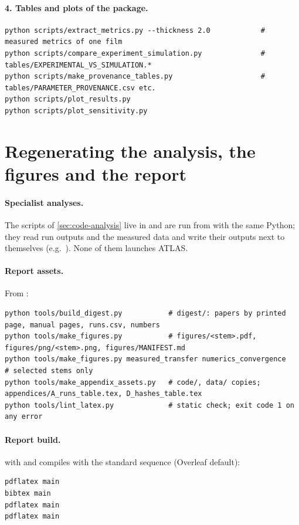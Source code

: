 \paragraph{4. Tables and plots of the package.}
\begin{lstlisting}[language={},numbers=none]
python scripts/extract_metrics.py --thickness 2.0            # measured metrics of one film
python scripts/compare_experiment_simulation.py              # tables/EXPERIMENTAL_VS_SIMULATION.*
python scripts/make_provenance_tables.py                     # tables/PARAMETER_PROVENANCE.csv etc.
python scripts/plot_results.py
python scripts/plot_sensitivity.py
\end{lstlisting}

\section{Regenerating the analysis, the figures and the report}\label{sec:repro-figures}

\paragraph{Specialist analyses.} The scripts of \cref{sec:code-analysis} live in
 and are run from  with the same Python;
they read run outputs and the measured data and write their outputs next to themselves
(e.g.\ ). None of them launches ATLAS.

\paragraph{Report assets.} From :
\begin{lstlisting}[language={},numbers=none]
python tools/build_digest.py           # digest/: papers by printed page, manual pages, runs.csv, numbers
python tools/make_figures.py           # figures/<stem>.pdf, figures/png/<stem>.png, figures/MANIFEST.md
python tools/make_figures.py measured_transfer numerics_convergence    # selected stems only
python tools/make_appendix_assets.py   # code/, data/ copies; appendices/A_runs_table.tex, D_hashes_table.tex
python tools/lint_latex.py             # static check; exit code 1 on any error
\end{lstlisting}

\paragraph{Report build.}  with  and  compiles with the standard
sequence (Overleaf default):
\begin{lstlisting}[language={},numbers=none]
pdflatex main
bibtex main
pdflatex main
pdflatex main
\end{lstlisting}

